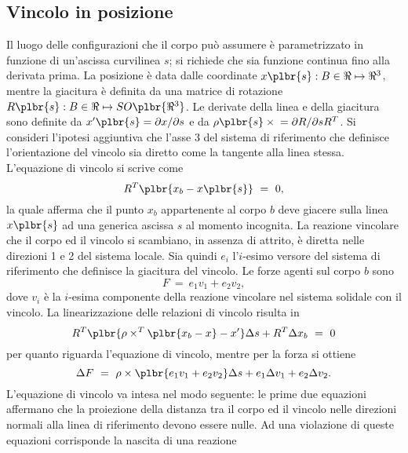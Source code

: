 \documentclass[12pt,dvips,fleqn,italian]{article}
\begin{document}
\subsection*{Vincolo in posizione}
Il luogo delle configurazioni che il corpo pu\`{o} assumere \`{e}
parametrizzato in funzione di un'ascissa curvilinea $ s $; si richiede che
sia funzione continua fino alla derivata prima.
La posizione \`{e} data dalle coordinate $ x\plbr{s}:B\in\Re\mapsto\Re^3 $,
mentre la giacitura \`{e} definita da una matrice di rotazione
$ R\plbr{s}:B\in\Re\mapsto{SO\plbr{\Re^3}} $.
Le derivate della linea e della giacitura sono definite da
$ x'\plbr{s}=\partial{x}/\partial{s} $ e da
$ \rho\plbr{s}\times{}=\partial{R}/\partial{s}R^T $.
Si consideri l'ipotesi aggiuntiva che l'asse 3 del sistema di riferimento
che definisce l'orientazione del vincolo sia diretto come la tangente alla
linea stessa.
L'equazione di vincolo si scrive come
\begin{displaymath}
    R^T \plbr{ x_b - x\plbr{s} } \ = \ 0 ,
\end{displaymath}
la quale afferma che il punto $ x_b $ appartenente al corpo $ b $ deve
giacere sulla linea $ x\plbr{s} $ ad una generica ascissa $ s $ al momento
incognita.
La reazione vincolare che il corpo ed il vincolo si scambiano, in assenza di
attrito, \`{e} diretta nelle direzioni 1 e 2 del sistema locale.
Sia quindi $ e_i $ l'$i$-esimo versore del sistema di riferimento che
definisce la giacitura del vincolo.
Le forze agenti sul corpo $ b $ sono
\begin{displaymath}
    F \ = \ e_1 v_1 + e_2 v_2 ,
\end{displaymath}
dove $ v_i $ \`{e} la $i$-esima componente della reazione vincolare nel
sistema solidale con il vincolo.
La linearizzazione delle relazioni di vincolo risulta in
\begin{displaymath}
    R^T \plbr{ \rho \times^T \plbr{ x_b - x } - x' }\Delta{s}
    + R^T \Delta{x_b} \ = \ 0
\end{displaymath}
per quanto riguarda l'equazione di vincolo, mentre per la forza si ottiene
\begin{displaymath}
    \Delta{F} \ = \ 
        \rho \times \plbr{ e_1 v_1 + e_2 v_2 } \Delta{s}
	+ e_1 \Delta{v_1} + e_2 \Delta{v_2} .
\end{displaymath}
L'equazione di vincolo va intesa nel modo seguente: le prime due equazioni
affermano che la proiezione della distanza tra il corpo ed il vincolo nelle
direzioni normali alla linea di riferimento devono essere nulle. 
Ad una violazione di queste equazioni corrisponde la nascita di una reazione
\end{document}
